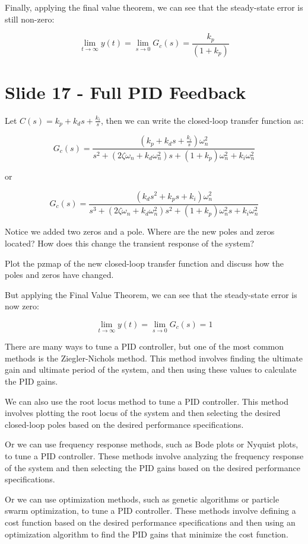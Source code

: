 \documentclass[
  letterpaper,
  DIV=11,
  numbers=noendperiod]{scrreprt}
\begin{document}
Finally, applying the final value theorem, we can see that the
steady-state error is still non-zero:

\[ \lim_{t\to\infty} y(t) = \lim_{s\to0} G_c(s) = \frac{k_p}{(1+k_p)} \]

\section{Slide 17 - Full PID
Feedback}\label{slide-17---full-pid-feedback}

Let \(C(s) = k_p + k_d s + \frac{k_i}{s}\), then we can write the
closed-loop transfer function as:

\[G_c(s) = \frac{(k_p + k_d s + \frac{k_i}{s})\omega_n^2}{s^2 + (2\zeta\omega_n + k_d\omega_n^2)s + (1+k_p)\omega_n^2 + k_i\omega_n^2}\]

or

\[G_c(s) = \frac{(k_d s^2 + k_p s + k_i)\omega_n^2}{s^3 + (2\zeta\omega_n + k_d\omega_n^2)s^2 + (1+k_p)\omega_n^2 s + k_i\omega_n^2}\]

Notice we added two zeros and a pole. Where are the new poles and zeros
located? How does this change the transient response of the system?

Plot the pzmap of the new closed-loop transfer function and discuss how
the poles and zeros have changed.

But applying the Final Value Theorem, we can see that the steady-state
error is now zero:

\[ \lim_{t\to\infty} y(t) = \lim_{s\to0} G_c(s) = 1 \]

There are many ways to tune a PID controller, but one of the most common
methods is the Ziegler-Nichols method. This method involves finding the
ultimate gain and ultimate period of the system, and then using these
values to calculate the PID gains.

We can also use the root locus method to tune a PID controller. This
method involves plotting the root locus of the system and then selecting
the desired closed-loop poles based on the desired performance
specifications.

Or we can use frequency response methods, such as Bode plots or Nyquist
plots, to tune a PID controller. These methods involve analyzing the
frequency response of the system and then selecting the PID gains based
on the desired performance specifications.

Or we can use optimization methods, such as genetic algorithms or
particle swarm optimization, to tune a PID controller. These methods
involve defining a cost function based on the desired performance
specifications and then using an optimization algorithm to find the PID
gains that minimize the cost function.
\end{document}
